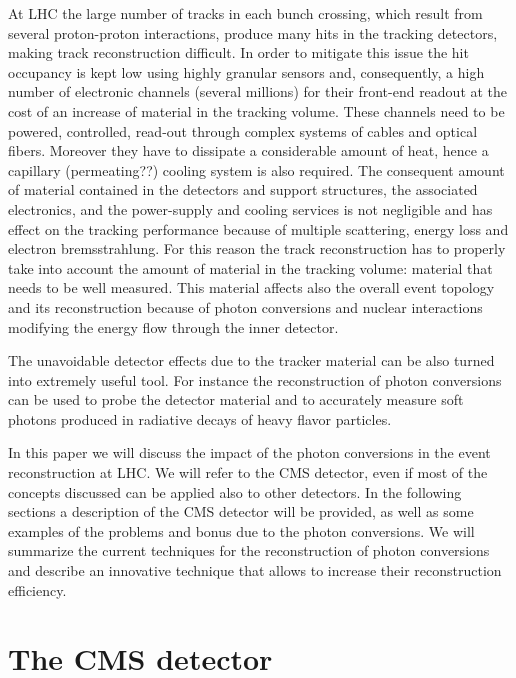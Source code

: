 \documentclass[a4paper]{jpconf}
\begin{document}
At LHC 
the large number of tracks in each bunch crossing, which result from several proton-proton interactions, produce many hits in the tracking detectors, making track reconstruction difficult. In order to mitigate this issue the hit occupancy is kept low using highly granular sensors and, consequently, a high number of electronic channels (several millions) for their front-end readout at the cost of an increase of material in the tracking volume. These channels need to be powered, controlled, read-out through  complex systems of cables and optical fibers. Moreover they have to dissipate a considerable amount of heat, hence a capillary (permeating??) cooling system is also required.
The consequent amount of material  contained in the detectors and support structures, the associated electronics, and the power-supply and cooling services is not negligible and has effect on the tracking performance because of multiple scattering, energy loss and electron bremsstrahlung. 
For this reason the track reconstruction has to properly take into account the amount of material in the tracking volume: material that needs to be well measured.  
This material  affects also the overall event topology and its reconstruction because of photon conversions and nuclear interactions modifying the energy flow through the inner detector.

The unavoidable detector effects due to the tracker material can be also turned into extremely useful tool. For instance the reconstruction of photon conversions can be used to probe the detector material and to accurately measure soft photons produced in radiative decays of heavy flavor particles. %
 
In this paper we will discuss the impact of the photon conversions in the event reconstruction at LHC.  We will refer to the CMS detector, even if most of the concepts discussed can be applied also to other detectors. 
In the following sections a description of the CMS detector will be provided, as well as some examples of the  problems and bonus due to the photon conversions.
We will summarize the current techniques for the reconstruction of photon conversions and describe an innovative technique that allows to increase their reconstruction efficiency.


\section{The CMS detector}
\end{document}
